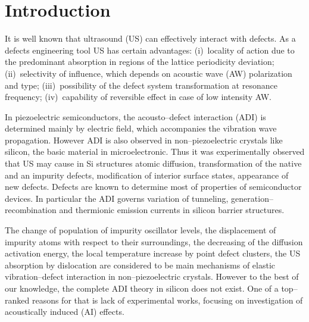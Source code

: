 \documentclass[aip,jap, amsmath,amssymb,reprint]{revtex4-1}
\begin{document}
\section{Introduction}
It is well known that ultrasound (US) can effectively interact with defects.
As a defects engineering tool US has certain advantages:
(i)~locality of action due to the predominant absorption in regions of the lattice periodicity deviation;
(ii)~selectivity of influence, which depends on acoustic wave (AW) polarization and type;
(iii)~possibility of the defect system transformation at resonance frequency;
(iv)~capability of reversible effect in case of low intensity AW.

In piezoelectric semiconductors, the acousto--defect interaction (ADI) is determined mainly by electric field, which accompanies the vibration wave propagation.
However ADI is also observed in non--piezoelectric crystals like silicon, the basic material in microelectronic.
Thus it was experimentally observed that US may cause in  Si structures
atomic diffusion, \cite{Roman:2010JAP,Roman:2007APL}
transformation of the native and an impurity defects, \cite{Ostapenko1994,Korotchenkov1995,Olikh2009Sem,Ostapenko1995,Ostrovskii2001}
modification of interior surface states,\cite{UST:Medvid,Zaver:2008,Mirsagatov}
appearance of new defects. \cite{Savkina2015,Virot}
Defects are known to determine most of properties of semiconductor devices.
In particular the ADI governs variation of tunneling, \cite{Olikh2016JSem,Olikh2011Sem} generation--recombination \cite{Davletova2009,Davletova2008,YOlikh2005} and  thermionic emission \cite{OlikhJAP,Olikh:Ultras} currents in silicon barrier structures.

The change  of  population  of  impurity  oscillator  levels,  \cite{Pavlovich}
the displacement of impurity atoms with respect to their surroundings, \cite{Korotchenkov1995,MirzadeJAP2011,PeleshchakUJF2016}
the decreasing of the diffusion activation  energy, \cite{Krevchik}
the local temperature increase by point defect clusters, \cite{MirzadeJAP2005}
the US absorption by dislocation\cite{Davletova2008,OstrovKor92,Olikh:Ultras2016}
are considered to be main mechanisms of elastic vibration--defect interaction in non--piezoelectric crystals. 
However to the best of our knowledge, the complete ADI theory in silicon does not exist.
One of a top--ranked reasons for that
is lack of experimental works, focusing on investigation of acoustically induced (AI) effects.
\end{document}
